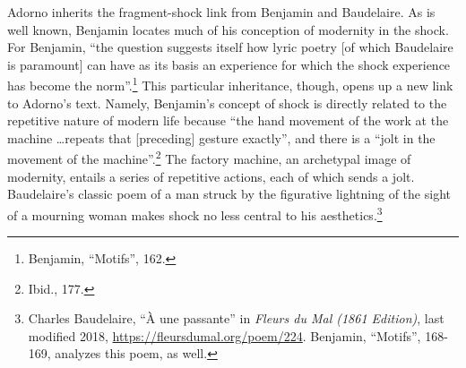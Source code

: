 \documentclass[12pt]{article}
\begin{document}
Adorno inherits the fragment-shock link from Benjamin and Baudelaire. As is well known, Benjamin locates much of his conception of modernity in the shock. For Benjamin, ``the question suggests itself how lyric poetry [of which Baudelaire is paramount] can have as its basis an experience for which the shock experience has become the norm''.\footnote{Benjamin, ``Motifs'', 162.} This particular inheritance, though, opens up a new link to Adorno's text. Namely, Benjamin's concept of shock is directly related to the repetitive nature of modern life because ``the hand movement of the work at the machine \dots  repeats that [preceding] gesture exactly'', and there is a ``jolt in the movement of the machine''.\footnote{Ibid., 177.} The factory machine, an archetypal image of modernity, entails a series of repetitive actions, each of which sends a jolt. Baudelaire's classic poem of a man struck by the figurative lightning of the sight of a mourning woman makes shock no less central to his aesthetics.\footnote{Charles Baudelaire, ``À une passante'' in \textit{Fleurs du Mal (1861 Edition)}, last modified 2018, \url{https://fleursdumal.org/poem/224}. Benjamin, ``Motifs'', 168-169, analyzes this poem, as well.}  
\end{document}

